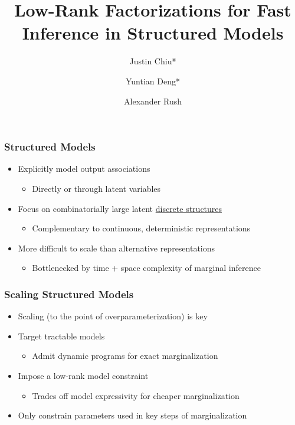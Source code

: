 \documentclass{beamer}
\title{Low-Rank Factorizations for Fast Inference in Structured Models}
\author{Justin Chiu* \inst{1} \and Yuntian Deng* \inst{2} \and Alexander Rush \inst{1}}
\institute[shortinst]{\inst{1} Cornell Tech \and \inst{2} Harvard University}
\begin{document}
\begin{frame}[plain]
\titlepage
\end{frame}

\begin{frame}
\frametitle{Structured Models}
\begin{itemize}
\item Explicitly model output associations
    \begin{itemize}
    \item Directly or through latent variables
    \end{itemize}
\vspace{1em}
\item Focus on combinatorially large latent \underline{discrete structures}
    \begin{itemize}
    \item Complementary to continuous, deterministic representations
    \end{itemize}
\vspace{1em}
\item More difficult to scale than alternative representations
\begin{itemize}
    \item Bottlenecked by time + space complexity of marginal inference
    \end{itemize}
\end{itemize}
\end{frame}

\begin{frame}
\frametitle{Scaling Structured Models}

\begin{itemize}
\item Scaling (to the point of overparameterization) is key
\vspace{1em}
\item Target tractable models
    \begin{itemize}
    \item Admit dynamic programs for exact marginalization
    \end{itemize}
\vspace{1em}
\item Impose a low-rank model constraint
    \begin{itemize}
    \item Trades off model expressivity for cheaper marginalization
    \end{itemize}
\vspace{1em}
\item Only constrain parameters used in key steps of marginalization
\end{itemize}
\end{frame}
\end{document}
